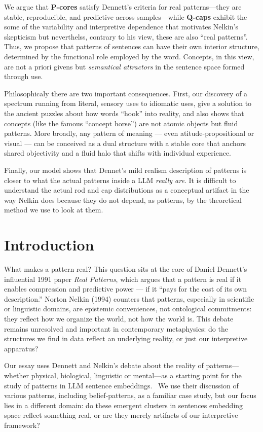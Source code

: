 \documentclass[12pt]{article}
\begin{document}
We argue that \textbf{P-cores} satisfy Dennett's criteria for real patterns---they are stable, reproducible, and predictive across samples---while \textbf{Q-caps} exhibit the some of the variability and interpretive dependence that motivates Nelkin's skepticism but neverthelss, contrary to his view, these are also ``real patterns''. Thus, we propose that patterns of sentences can have their own interior structure, determined by the functional role employed by the word. Concepts, in this view, are not a priori givens but \emph{semantical attractors} in the sentence space formed through use.

Philosophicaly there are two important consequences. First, our discovery of a spectrum running from literal, sensory uses to idiomatic uses, give a solution to the ancient puzzles about how words ``hook'' into reality, and also shows that concepts (like the famous ``concept horse'') are not atomic objects but fluid patterns. More broadly, any pattern of meaning --- even atitude-propositional or visual --- can be conceived as a dual structure with a stable core that anchors shared objectivity and a fluid halo that shifts with individual experience.

Finally, our model shows that Dennet's mild realism description of patterns is closer to what the actual patterns inside a LLM \emph{really are}. It is difficult to understand the actual rod and cap distributions as a conceptual artifact in the way Nelkin does because they do not depend, as patterns, by the theoretical method we use to look at them.

\section{Introduction}\label{introduction}

What makes a pattern real? This question sits at the core of Daniel Dennett's influential 1991 paper \emph{Real Patterns}, which argues that a pattern is real if it enables compression and predictive power --- if it ``pays for the cost of its own description.'' Norton Nelkin (1994) counters that patterns, especially in scientific or linguistic domains, are epistemic conveniences, not ontological commitments: they reflect how we organize the world, not how the world is. This debate remains unresolved and important in contemporary metaphysics: do the structures we find in data reflect an underlying reality, or just our interpretive apparatus?

Our essay uses Dennett and Nelkin's debate about the reality of patterns---whether physical, biological, linguistic or mental---as a starting point for the study of patterns in LLM sentence embeddings.~ We use their discussion of various patterns, including belief‑patterns, as a familiar case study, but our focus lies in a different domain: do these emergent clusters in sentences embedding space reflect something real, or are they merely artifacts of our interpretive framework?~
\end{document}
